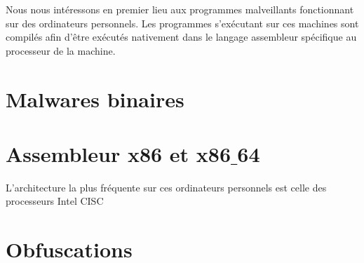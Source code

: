 Nous nous intéressons en premier lieu aux programmes malveillants fonctionnant sur des ordinateurs personnels.
Les programmes s'exécutant sur ces machines sont compilés afin d'être exécutés nativement dans le langage assembleur spécifique au processeur de la machine.


\section{Malwares binaires}

\section{Assembleur x86 et x86$\_$64}
L'architecture la plus fréquente sur ces ordinateurs personnels est celle des processeurs Intel CISC

\section{Obfuscations}
